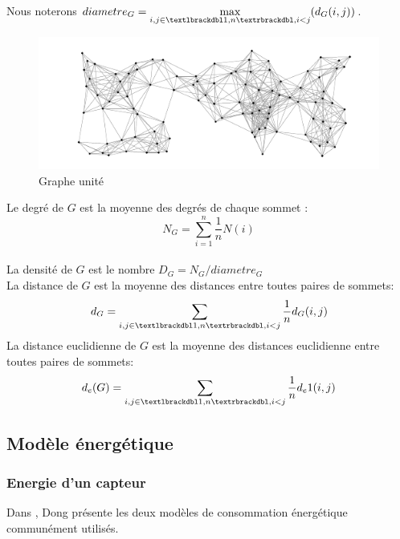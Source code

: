 \begin{mydef}
Nous noterons $diametre_G= \max\limits_{i,j\in \textlbrackdbl 1,n \textrbrackdbl,i<j} (d_G(i,j))$.
\end{mydef}
 

\begin{figure}[H]
\centering
\includegraphics[scale=0.5]{Etat_de_l'art/source/graph1.png}
\caption{Graphe unité}
\end{figure} 



\begin{mydef}
 
 Le degré de $G$ est la moyenne des degrés de chaque sommet : $$N_G=\sum_{i=1}^n{\frac1n N(i)}$$\\
 La densité de $G$ est le nombre $D_G=N_G/diametre_G$\\
 La distance de $G$ est la moyenne des distances entre toutes paires de sommets:$$d_G=\sum_{i,j\in \textlbrackdbl 1,n \textrbrackdbl,i<j}{\frac1n d_G(i,j)}$$
 La distance euclidienne de $G$ est la moyenne des distances euclidienne entre toutes paires de sommets:$$d_e(G)=\sum_{i,j\in \textlbrackdbl 1,n \textrbrackdbl,i<j}{\frac1n d_e1(i,j)}$$

\end{mydef}


\subsection{Modèle énergétique}
\subsubsection{Energie d'un capteur}
Dans \cite{Dong2005}, Dong présente les deux modèles de consommation énergétique communément utilisés.
